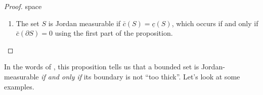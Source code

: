 \documentclass{article}
\theoremstyle{definition}
\begin{document}
\begin{proof}{\color{white}space}
\begin{enumerate}
\begin{align*}
		\implies &\bar J(P,\partial S) < \bar c(S) - \underline c(S) + \varepsilon & (\forall \varepsilon > 0,P = P_1\cup P_2\in \mathbf P(Q))\\
		\implies & \bar J(P,\partial S) \le \bar c(S) - \underline c(S) & (\forall P = P_1\cup P_2\in \mathbf P(Q)) \\
		\implies &\underbrace{ \inf_{P\in \textbf{P}(Q)}\bar J(P,\partial S)}_{\bar c(\partial S)}   \le \bar c(\partial S) - \underline c(S) & (\forall P = P_1\cup P_2\in \mathbf P(Q)) \\\implies & \bar c(\partial S)\le \bar c( S) - \underline c(S) .
		\end{align*}
	Therefore, $\bar c(\partial S)\le \bar c( S) - \underline c(S)$ \textit{and} $\bar c(\partial S)\ge \bar c(S) - \underline c(S)$, so 
	$$ \bar c(S)= \bar c(\partial S) - \underline c(S).$$
		\item The set $S$ is Jordan measurable if $\bar c(S) =  \underline c(S)$, which occurs if and only if $\bar c(\partial S) = 0$ using the first part of the proposition. 
	\end{enumerate}
\end{proof}
In the words of \cite{apostol}, this proposition tells us that a bounded set is Jordan-measurable \textit{if and only if} its boundary is not ``too thick''. Let's look at some examples. 
\end{document}
